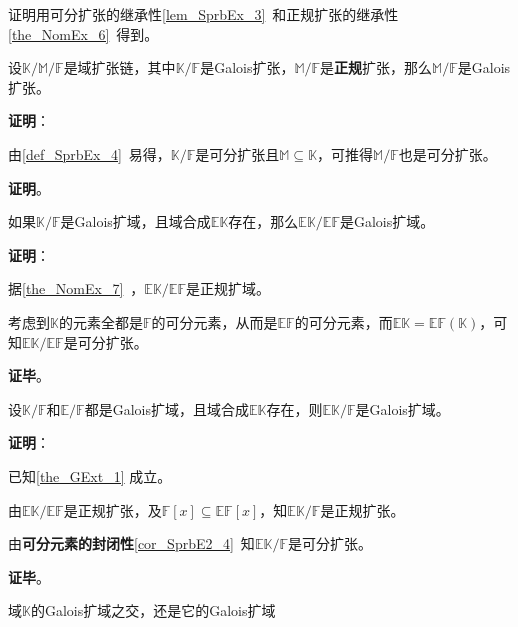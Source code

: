 证明用可分扩张的继承性\autoref{lem_SprbEx_3}~和正规扩张的继承性\autoref{the_NomEx_6}~得到。

\begin{theorem}{}\label{the_GExt_5}
设$\mathbb{K}/\mathbb{M}/\mathbb{F}$是域扩张链，其中$\mathbb{K}/\mathbb{F}$是Galois扩张，$\mathbb{M}/\mathbb{F}$是\textbf{正规}扩张，那么$\mathbb{M}/\mathbb{F}$是Galois扩张。
\end{theorem}

\textbf{证明}：

由\autoref{def_SprbEx_4}~易得，$\mathbb{K}/\mathbb{F}$是可分扩张且$\mathbb{M}\subseteq\mathbb{K}$，可推得$\mathbb{M}/\mathbb{F}$也是可分扩张。

\textbf{证明}。

\begin{theorem}{}\label{the_GExt_1}
如果$\mathbb{K}/\mathbb{F}$是Galois扩域，且域合成$\mathbb{EK}$存在，那么$\mathbb{EK}/\mathbb{EF}$是Galois扩域。
\end{theorem}

\textbf{证明}：

据\autoref{the_NomEx_7}~，$\mathbb{EK}/\mathbb{EF}$是正规扩域。

考虑到$\mathbb{K}$的元素全都是$\mathbb{F}$的可分元素，从而是$\mathbb{EF}$的可分元素，而$\mathbb{EK}=\mathbb{EF}(\mathbb{K})$，可知$\mathbb{EK}/\mathbb{EF}$是可分扩张。

\textbf{证毕}。



\begin{theorem}{}
设$\mathbb{K}/\mathbb{F}$和$\mathbb{E}/\mathbb{F}$都是Galois扩域，且域合成$\mathbb{EK}$存在，则$\mathbb{EK}/\mathbb{F}$是Galois扩域。
\end{theorem}

\textbf{证明}：

已知\autoref{the_GExt_1} 成立。

由$\mathbb{EK}/\mathbb{EF}$是正规扩张，及$\mathbb{F}[x]\subseteq\mathbb{EF}[x]$，知$\mathbb{EK}/\mathbb{F}$是正规扩张。

由\textbf{可分元素的封闭性}\autoref{cor_SprbE2_4}~知$\mathbb{EK}/\mathbb{F}$是可分扩张。

\textbf{证毕}。




\begin{theorem}{}
域$\mathbb{K}$的Galois扩域之交，还是它的Galois扩域
\end{theorem}

